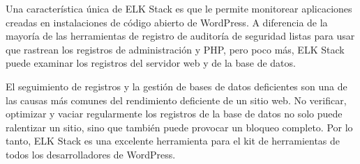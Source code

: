 Una característica única de ELK Stack es que le permite monitorear aplicaciones creadas en instalaciones de código abierto de WordPress. A diferencia de la mayoría de las herramientas de registro de auditoría de seguridad listas para usar que rastrean los registros de administración y PHP, pero poco más, ELK Stack puede examinar los registros del servidor web y de la base de datos.

El seguimiento de registros y la gestión de bases de datos deficientes son una de las causas más comunes del rendimiento deficiente de un sitio web. No verificar, optimizar y vaciar regularmente los registros de la base de datos no solo puede ralentizar un sitio, sino que también puede provocar un bloqueo completo. Por lo tanto, ELK Stack es una excelente herramienta para el kit de herramientas de todos los desarrolladores de WordPress.


